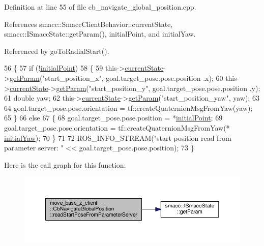 Definition at line 55 of file cb\+\_\+navigate\+\_\+global\+\_\+position.\+cpp.



References smacc\+::\+Smacc\+Client\+Behavior\+::current\+State, smacc\+::\+I\+Smacc\+State\+::get\+Param(), initial\+Point, and initial\+Yaw.



Referenced by go\+To\+Radial\+Start().


\begin{DoxyCode}
56 \{
57     \textcolor{keywordflow}{if} (!\hyperlink{classmove__base__z__client_1_1CbNavigateGlobalPosition_a603d293ad4557e8332fcfd264d7075d4}{initialPoint})
58     \{
59         this->\hyperlink{classsmacc_1_1SmaccClientBehavior_af76fc9b877542ed5caf033f820c107d0}{currentState}->\hyperlink{classsmacc_1_1ISmaccState_abbb3a24b912c6e8de28f7b86123b6357}{getParam}(\textcolor{stringliteral}{"start\_position\_x"}, goal.target\_pose.pose.position
      .x);
60         this->\hyperlink{classsmacc_1_1SmaccClientBehavior_af76fc9b877542ed5caf033f820c107d0}{currentState}->\hyperlink{classsmacc_1_1ISmaccState_abbb3a24b912c6e8de28f7b86123b6357}{getParam}(\textcolor{stringliteral}{"start\_position\_y"}, goal.target\_pose.pose.position
      .y);
61         \textcolor{keywordtype}{double} yaw;
62         this->\hyperlink{classsmacc_1_1SmaccClientBehavior_af76fc9b877542ed5caf033f820c107d0}{currentState}->\hyperlink{classsmacc_1_1ISmaccState_abbb3a24b912c6e8de28f7b86123b6357}{getParam}(\textcolor{stringliteral}{"start\_position\_yaw"}, yaw);
63 
64         goal.target\_pose.pose.orientation = tf::createQuaternionMsgFromYaw(yaw);
65     \}
66     \textcolor{keywordflow}{else}
67     \{
68         goal.target\_pose.pose.position = *\hyperlink{classmove__base__z__client_1_1CbNavigateGlobalPosition_a603d293ad4557e8332fcfd264d7075d4}{initialPoint};
69         goal.target\_pose.pose.orientation = tf::createQuaternionMsgFromYaw(*
      \hyperlink{classmove__base__z__client_1_1CbNavigateGlobalPosition_a339ec9b992e2565f404d8a2fa8a5be87}{initialYaw});
70     \}
71 
72     ROS\_INFO\_STREAM(\textcolor{stringliteral}{"start position read from parameter server: "} << goal.target\_pose.pose.position);
73 \}
\end{DoxyCode}


Here is the call graph for this function\+:\nopagebreak
\begin{figure}[H]
\begin{center}
\leavevmode
\includegraphics[width=350pt]{classmove__base__z__client_1_1CbNavigateGlobalPosition_a866ea02c9e25ac1df9df88272deb04b3_cgraph}
\end{center}
\end{figure}




